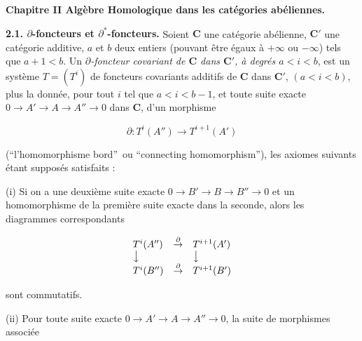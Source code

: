 \bigskip
\begin{center}
{\normalsize\bfseries Chapitre II Algèbre Homologique dans les catégories
abéliennes.}
\end{center}

\textbf{2.1. $\partial$-foncteurs et
$\partial^*$-foncteurs.}
Soient $\mathbf{C}$ une catégorie abélienne, $\mathbf{C}'$ une catégorie additive, $a$ et $b$
deux entiers (pouvant être égaux à $+\infty$ ou $-\infty$) tels que
$a+1<b$. Un \textit{$\partial$-foncteur covariant de $\mathbf{C}$ dans $\mathbf{C}'$, à degrés
$a<i<b$}, est un système $T=(T^i)$ de foncteurs covariants additifs de $\mathbf{C}$
dans $\mathbf{C}'$, $(a<i<b)$, plus la donnée, pour tout $i$ tel que $a<i<b-1$, et
toute suite exacte
$0\to A'\to A\to A''\to 0$
dans $\mathbf{C}$, d'un morphisme

\[
 \partial:T^i(A'')\to T^{i+1}(A')
\]

\noindent (\textquotedblleft l'homomorphisme bord\textquotedblright\ ou
\textquotedblleft connecting homomorphism\textquotedblright), les axiomes
suivants étant supposés satisfaits :

 (i) Si on a une deuxième suite exacte
$0\to B'\to B\to B''\to 0$ et
un homomorphisme de la première suite exacte dans la seconde, alors les
diagrammes correspondants

\[
\begin{array}{lcl}
T^i(A'') & \mathop{\to}\limits^{\partial} & T^{i+1}(A')\\
\big\downarrow && \big\downarrow\\
T^i(B'') & \mathop{\to}\limits^{\partial} & T^{i+1}(B')
\end{array}
\]

\noindent sont commutatifs.

 (ii) Pour toute suite exacte
$0\to A'\to A\to A''\to 0$,
la suite de morphismes associée

